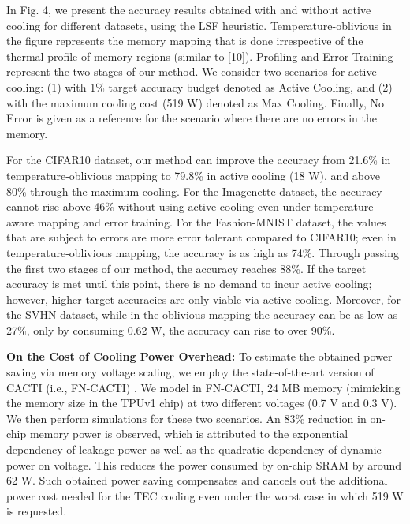 \documentclass[sigconf]{acmart}
\begin{document}
In Fig. 4, we present the accuracy results obtained with and without active cooling for different datasets, using the LSF heuristic. Temperature-oblivious in the figure represents the memory mapping that is done irrespective of the thermal profile of memory regions (similar to [10]). Profiling and Error Training represent the two stages of our method. We consider two scenarios for active cooling: (1) with 1\% target accuracy budget denoted as Active Cooling, and (2) with the maximum cooling cost (519 W) denoted as Max Cooling. Finally, No Error is given as a reference for the scenario where there are no errors in the memory.

For the CIFAR10 dataset, our method can improve the accuracy from 21.6\% in temperature-oblivious mapping to 79.8\% in active cooling (18 W), and above 80\% through the maximum cooling. For the Imagenette dataset, the accuracy cannot rise above 46\% without using active cooling even under temperature-aware mapping and error training. For the Fashion-MNIST dataset, the values that are subject to errors are more error tolerant compared to CIFAR10; even in temperature-oblivious mapping, the accuracy is as high as 74\%. Through passing the first two stages of our method, the accuracy reaches 88\%. If the target accuracy is met until this point, there is no demand to incur active cooling; however, higher target accuracies are only viable via active cooling. Moreover, for the SVHN dataset, while in the oblivious mapping the accuracy can be as low as 27\%, only by consuming 0.62 W, the accuracy can rise to over 90\%.

\textbf{On the Cost of Cooling Power Overhead: }To estimate the obtained power saving via memory voltage scaling, we employ the state-of-the-art version of CACTI (i.e., FN-CACTI) \cite{ref17}. We model in FN-CACTI, 24 MB memory (mimicking the memory size in the TPUv1 chip) at two different voltages (0.7 V and 0.3 V). We then perform simulations for these two scenarios. An 83\% reduction in on-chip memory power is observed, which is attributed to the exponential dependency of leakage power as well as the quadratic dependency of dynamic power on voltage. This reduces the power consumed by on-chip SRAM by around 62 W. Such obtained power saving compensates and cancels out the additional power cost needed for the TEC cooling even under the worst case in which 519 W is requested.
\end{document}
